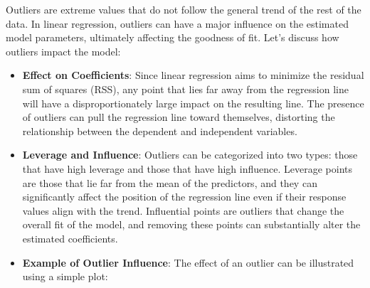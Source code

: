 \documentclass[
  12 pt,
  a4paper,
]{book}
\numberwithin{equation}{section}
\theoremstyle{plain}      %
\theoremstyle{definition} %
\theoremstyle{remark}     %
\theoremstyle{note}         %
\begin{document}
Outliers are extreme values that do not follow the general trend of the
rest of the data. In linear regression, outliers can have a major
influence on the estimated model parameters, ultimately affecting the
goodness of fit. Let's discuss how outliers impact the model:

\begin{itemize}
\item
  \textbf{Effect on Coefficients}: Since linear regression aims to
  minimize the residual sum of squares (RSS), any point that lies far
  away from the regression line will have a disproportionately large
  impact on the resulting line. The presence of outliers can pull the
  regression line toward themselves, distorting the relationship between
  the dependent and independent variables.
\item
  \textbf{Leverage and Influence}: Outliers can be categorized into two
  types: those that have high leverage and those that have high
  influence. Leverage points are those that lie far from the mean of the
  predictors, and they can significantly affect the position of the
  regression line even if their response values align with the trend.
  Influential points are outliers that change the overall fit of the
  model, and removing these points can substantially alter the estimated
  coefficients.
\item
  \textbf{Example of Outlier Influence}: The effect of an outlier can be
  illustrated using a simple plot:
\end{itemize}

\scriptsize
\end{document}
